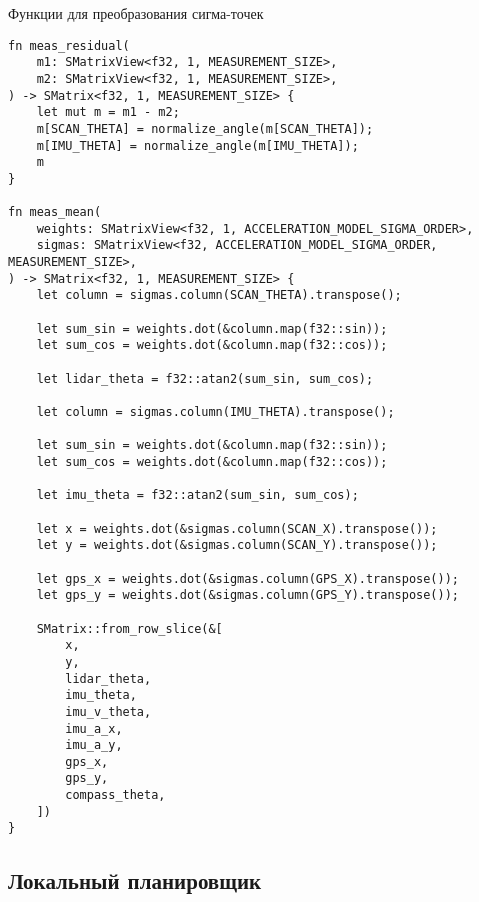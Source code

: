 Функции для преобразования сигма-точек
\begin{lstlisting}
fn meas_residual(
    m1: SMatrixView<f32, 1, MEASUREMENT_SIZE>,
    m2: SMatrixView<f32, 1, MEASUREMENT_SIZE>,
) -> SMatrix<f32, 1, MEASUREMENT_SIZE> {
    let mut m = m1 - m2;
    m[SCAN_THETA] = normalize_angle(m[SCAN_THETA]);
    m[IMU_THETA] = normalize_angle(m[IMU_THETA]);
    m
}

fn meas_mean(
    weights: SMatrixView<f32, 1, ACCELERATION_MODEL_SIGMA_ORDER>,
    sigmas: SMatrixView<f32, ACCELERATION_MODEL_SIGMA_ORDER, MEASUREMENT_SIZE>,
) -> SMatrix<f32, 1, MEASUREMENT_SIZE> {
    let column = sigmas.column(SCAN_THETA).transpose();

    let sum_sin = weights.dot(&column.map(f32::sin));
    let sum_cos = weights.dot(&column.map(f32::cos));

    let lidar_theta = f32::atan2(sum_sin, sum_cos);

    let column = sigmas.column(IMU_THETA).transpose();

    let sum_sin = weights.dot(&column.map(f32::sin));
    let sum_cos = weights.dot(&column.map(f32::cos));

    let imu_theta = f32::atan2(sum_sin, sum_cos);

    let x = weights.dot(&sigmas.column(SCAN_X).transpose());
    let y = weights.dot(&sigmas.column(SCAN_Y).transpose());

    let gps_x = weights.dot(&sigmas.column(GPS_X).transpose());
    let gps_y = weights.dot(&sigmas.column(GPS_Y).transpose());

    SMatrix::from_row_slice(&[
        x,
        y,
        lidar_theta,
        imu_theta,
        imu_v_theta,
        imu_a_x,
        imu_a_y,
        gps_x,
        gps_y,
        compass_theta,
    ])
}
\end{lstlisting}






\subsection{Локальный планировщик}

